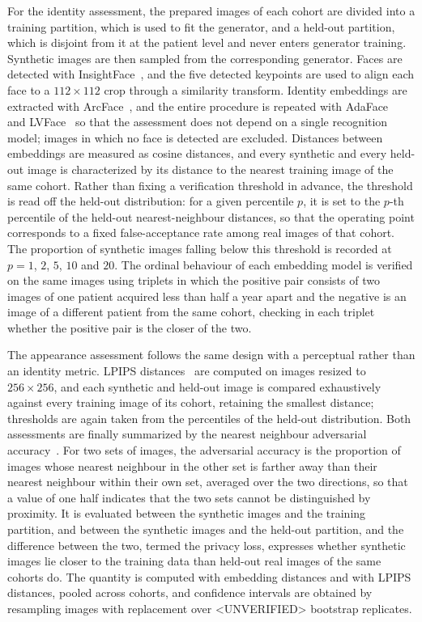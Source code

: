 For the identity assessment, the prepared images of each cohort are divided
into a training partition, which is used to fit the generator, and a held-out
partition, which is disjoint from it at the patient level and never enters
generator training. Synthetic images are then sampled from the corresponding
generator. Faces are detected with InsightFace~\cite{insightface}, and the
five detected keypoints are used to align each face to a $112\times112$ crop
through a similarity transform. Identity embeddings are extracted with
ArcFace~\cite{arcface}, and the entire procedure is repeated with
AdaFace~\cite{adaface} and LVFace~\cite{lvface} so that the assessment does not
depend on a single recognition model; images in which no face is detected are
excluded. Distances between embeddings are measured as cosine distances, and
every synthetic and every held-out image is characterized by its distance to
the nearest training image of the same cohort. Rather than fixing a
verification threshold in advance, the threshold is read off the held-out
distribution: for a given percentile $p$, it is set to the $p$-th percentile of
the held-out nearest-neighbour distances, so that the operating point
corresponds to a fixed false-acceptance rate among real images of that cohort.
The proportion of synthetic images falling below this threshold is recorded at
$p = 1$, $2$, $5$, $10$ and $20$. The ordinal behaviour of each embedding model
is verified on the same images using triplets in which the positive pair
consists of two images of one patient acquired less than half a year apart and
the negative is an image of a different patient from the same cohort, checking
in each triplet whether the positive pair is the closer of the two.

The appearance assessment follows the same design with a perceptual rather
than an identity metric. LPIPS distances~\cite{lpips} are computed on images
resized to $256\times256$, and each synthetic and held-out image is compared
exhaustively against every training image of its cohort, retaining the
smallest distance; thresholds are again taken from the percentiles of the
held-out distribution. Both assessments are finally summarized by the nearest
neighbour adversarial accuracy~\cite{nnaa}. For two sets of images, the
adversarial accuracy is the proportion of images whose nearest neighbour in
the other set is farther away than their nearest neighbour within their own
set, averaged over the two directions, so that a value of one half indicates
that the two sets cannot be distinguished by proximity. It is evaluated
between the synthetic images and the training partition, and between the
synthetic images and the held-out partition, and the difference between the
two, termed the privacy loss, expresses whether synthetic images lie closer to
the training data than held-out real images of the same cohorts do. The
quantity is computed with embedding distances and with LPIPS distances, pooled
across cohorts, and confidence intervals are obtained by resampling images
with replacement over <UNVERIFIED> bootstrap replicates.
